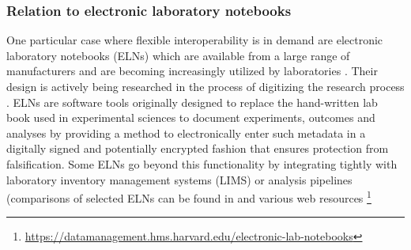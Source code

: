 \subsubsection{Relation to electronic laboratory notebooks}
One particular case where flexible interoperability is in demand are electronic laboratory notebooks (ELNs) which are available from a large range of manufacturers and are becoming increasingly utilized by laboratories \citep{Kwok_2018}. Their design is actively being researched in the process of digitizing the research process \citep{Kanza_2017}. ELNs are software tools originally designed to replace the hand-written lab book used in experimental sciences to document experiments, outcomes and analyses by providing a method to electronically enter such metadata in a digitally signed and potentially encrypted fashion that ensures protection from falsification. Some ELNs go beyond this functionality by integrating tightly with laboratory inventory management systems (LIMS) or analysis pipelines (comparisons of selected ELNs can be found in \citep{Rubacha_2011} and various web resources
\footnote{\url{https://datamanagement.hms.harvard.edu/electronic-lab-notebooks}}
